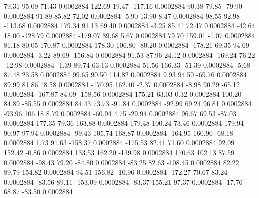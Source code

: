        79.31       95.09       71.43     0.0002884
      122.69       19.47     -117.16     0.0002884
       90.38       79.85      -79.90     0.0002884
       91.89       85.82       72.02     0.0002884
       -5.90       13.90        8.47     0.0002884
       98.55       92.98     -113.68     0.0002884
      179.34       91.13       69.40     0.0002884
       -3.25       85.41       72.47     0.0002884
      -42.64       18.00     -128.79     0.0002884
     -179.07       89.68        5.67     0.0002884
       79.70      159.01       -1.07     0.0002884
       81.18       80.05      170.87     0.0002884
      178.30      106.80      -80.20     0.0002884
     -178.21       69.35       94.69     0.0002884
       -3.22       89.69     -156.84     0.0002884
       91.53       87.96       24.12     0.0002884
     -169.24       76.22      -12.98     0.0002884
       -1.39       89.74       63.13     0.0002884
       51.56      166.33      -51.39     0.0002884
       -5.68       87.48       23.58     0.0002884
       99.65       90.50      114.82     0.0002884
        9.93       94.50      -69.76     0.0002884
       89.99       81.86       18.58     0.0002884
     -170.95      162.40       -2.37     0.0002884
       -8.98       90.29      -65.12     0.0002884
     -167.87       84.09     -158.56     0.0002884
      175.21       63.03        0.32     0.0002884
      100.20       84.89      -85.55     0.0002884
       84.43       73.73      -91.84     0.0002884
      -92.99       69.24       96.81     0.0002884
      -93.96      106.18        8.79     0.0002884
      -60.94        4.75      -29.94     0.0002884
       96.67       69.53      -87.03     0.0002884
      177.35       79.36      163.88     0.0002884
      179.48      100.24       73.46     0.0002884
      179.94       90.97       97.94     0.0002884
      -99.43      105.74      168.87     0.0002884
     -164.95      160.90      -68.18     0.0002884
        1.73       91.63     -158.37     0.0002884
     -175.53       82.41       71.60     0.0002884
       92.09      152.42       -0.86     0.0002884
      133.53      162.20     -139.98     0.0002884
      170.63      102.13       87.59     0.0002884
      -98.43       79.20      -84.80     0.0002884
      -83.25       82.63     -108.45     0.0002884
       82.22       89.79      154.82     0.0002884
       94.51      156.82      -10.96     0.0002884
     -172.27       70.67       83.24     0.0002884
      -83.56       89.11     -153.09     0.0002884
      -83.37      155.21       97.37     0.0002884
      -17.76       68.87      -83.50     0.0002884
